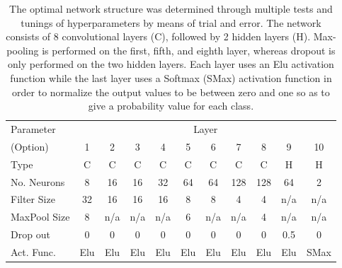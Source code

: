 \documentclass[%
showpacs,
 amsmath,amssymb,
 aps,
 twocolumn,
 prl,
 reprint,
floatfix,
]{revtex4-1}
\newcommand{\chris}[1]{\textbf{\textcolor{green}{CHRIS: #1}}}
\newcommand{\hunter}[1]{\textbf{\textcolor{blue}{HUNTER: #1}}}
\begin{document}
% 
%

\begin{table}[]
\begin{tabular}{lcccccccccc}
\hline
\hline
Parameter & \multicolumn{10}{c}{Layer}\\
\cline{2-11}
(Option) & 1 & 2 & 3 & 4 & 5 & 6 & 7 & 8 & 9 & 10 \\
\hline
Type & C & C & C & C & C & C & C & C & H & H \\
No. Neurons  & 8  & 16  & 16 & 32 & 64 & 64 & 128 & 128 & 64  & 2  \\
Filter Size  & 32 & 16  & 16 & 16 & 8  & 8  & 4   & 4   & n/a & n/a \\
MaxPool Size & 8 & n/a & n/a & n/a & 6 & n/a & n/a & 4 & n/a & n/a \\
Drop out  & 0 & 0 & 0 & 0 & 0 & 0 & 0 & 0 & 0.5 & 0 \\
Act. Func. & Elu & Elu & Elu & Elu & Elu & Elu & Elu & Elu & Elu & SMax \\
\hline
\end{tabular}
\caption{The optimal network structure was determined through multiple tests
and tunings of hyperparameters by means of trial and error. The network
consists of 8 convolutional layers (C), followed by 2 hidden layers (H).
Max-pooling is performed on the first, fifth, and eighth layer,
whereas dropout is only performed on the two hidden layers. Each layer
uses an Elu activation function while the last layer uses a Softmax (SMax) activation
function in order to normalize the output values to be between zero and one so
as to give a probability value for each class.\label{table:network}}
\end{table}
\end{document}
